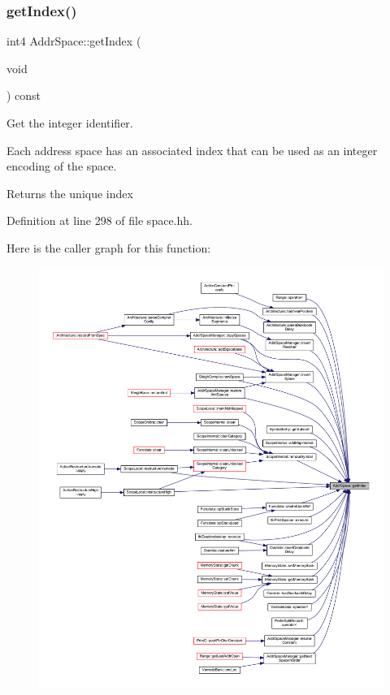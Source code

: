 \subsubsection{\texorpdfstring{getIndex()}{getIndex()}}
{\footnotesize\ttfamily int4 Addr\+Space\+::get\+Index (\begin{DoxyParamCaption}\item[{void}]{ }\end{DoxyParamCaption}) const\hspace{0.3cm}{\ttfamily [inline]}}



Get the integer identifier. 

Each address space has an associated index that can be used as an integer encoding of the space. \begin{DoxyReturn}{Returns}
the unique index 
\end{DoxyReturn}


Definition at line 298 of file space.\+hh.

Here is the caller graph for this function\+:
\nopagebreak
\begin{figure}[H]
\begin{center}
\leavevmode
\includegraphics[width=350pt]{class_addr_space_abac46fe0121579ac29f2e8e93753183d_icgraph}
\end{center}
\end{figure}
\mbox{\label{class_addr_space_a1274986fce0448a40a055fb2bcd7aeb1}} 

